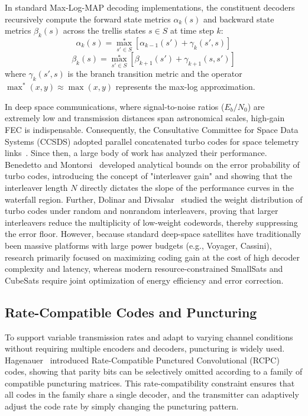 \documentclass[journal,twocolumn]{IEEEtran}
\begin{document}
In standard Max-Log-MAP decoding implementations, the constituent decoders recursively compute the forward state metrics $\alpha_k(s)$ and backward state metrics $\beta_k(s)$ across the trellis states $s \in S$ at time step $k$:
\begin{equation}
  \alpha_k(s) = \max_{s' \in S}^{*} \left[ \alpha_{k-1}(s') + \gamma_k(s', s) \right]
\end{equation}
\begin{equation}
  \beta_k(s) = \max_{s' \in S}^{*} \left[ \beta_{k+1}(s') + \gamma_{k+1}(s, s') \right]
\end{equation}
where $\gamma_k(s', s)$ is the branch transition metric and the operator $\max_{}^{*}(x, y) \approx \max(x, y)$ represents the max-log approximation.

In deep space communications, where signal-to-noise ratios ($E_b/N_0$) are extremely low and transmission distances span astronomical scales, high-gain FEC is indispensable. Consequently, the Consultative Committee for Space Data Systems (CCSDS) adopted parallel concatenated turbo codes for space telemetry links~\cite{ccsds2010turbo}. Since then, a large body of work has analyzed their performance. Benedetto and Montorsi~\cite{benedetto1996bcjr} developed analytical bounds on the error probability of turbo codes, introducing the concept of "interleaver gain" and showing that the interleaver length $N$ directly dictates the slope of the performance curves in the waterfall region. Further, Dolinar and Divsalar~\cite{dolinar1995interleaver} studied the weight distribution of turbo codes under random and nonrandom interleavers, proving that larger interleavers reduce the multiplicity of low-weight codewords, thereby suppressing the error floor. However, because standard deep-space satellites have traditionally been massive platforms with large power budgets (e.g., Voyager, Cassini), research primarily focused on maximizing coding gain at the cost of high decoder complexity and latency, whereas modern resource-constrained SmallSats and CubeSats require joint optimization of energy efficiency and error correction.

\subsection{Rate-Compatible Codes and Puncturing}
To support variable transmission rates and adapt to varying channel conditions without requiring multiple encoders and decoders, puncturing is widely used. Hagenauer~\cite{hagenauer1988rate} introduced Rate-Compatible Punctured Convolutional (RCPC) codes, showing that parity bits can be selectively omitted according to a family of compatible puncturing matrices. This rate-compatibility constraint ensures that all codes in the family share a single decoder, and the transmitter can adaptively adjust the code rate by simply changing the puncturing pattern.
\end{document}
